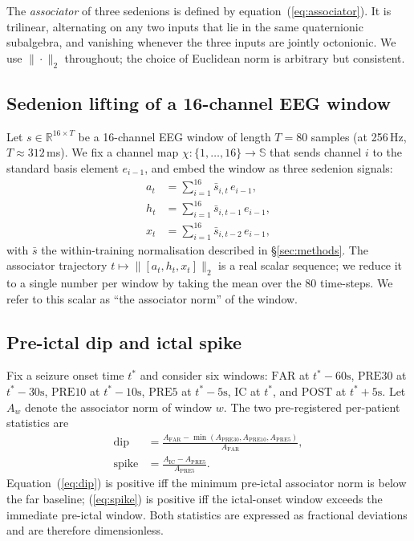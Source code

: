 \documentclass[11pt,twocolumn]{article}
\begin{document}
The \emph{associator} of three sedenions is defined by
equation~(\ref{eq:associator}). It is trilinear, alternating on any
two inputs that lie in the same quaternionic subalgebra, and
vanishing whenever the three inputs are jointly octonionic. We use
$\|\cdot\|_2$ throughout; the choice of Euclidean norm is arbitrary
but consistent.

\subsection{Sedenion lifting of a 16-channel EEG window}
Let $s\in\mathbb{R}^{16\times T}$ be a 16-channel EEG window of
length $T=80$ samples (at 256\,Hz, $T\approx 312$\,ms). We fix a
channel map $\chi:\{1,\ldots,16\}\to\mathbb{S}$ that sends channel
$i$ to the standard basis element $e_{i-1}$, and embed the window as
three sedenion signals:
\begin{align}
  a_t &= \textstyle\sum_{i=1}^{16} \bar{s}_{i,t}\,e_{i-1}, \\
  h_t &= \textstyle\sum_{i=1}^{16} \bar{s}_{i,t-1}\,e_{i-1}, \\
  x_t &= \textstyle\sum_{i=1}^{16} \bar{s}_{i,t-2}\,e_{i-1},
\end{align}
with $\bar{s}$ the within-training normalisation described in
\S\ref{sec:methods}. The associator trajectory
$t\mapsto \|[a_t,h_t,x_t]\|_2$ is a real scalar sequence; we reduce
it to a single number per window by taking the mean over the 80
time-steps. We refer to this scalar as ``the associator norm'' of the
window.

\subsection{Pre-ictal dip and ictal spike}
Fix a seizure onset time $t^{\ast}$ and consider six windows:
$\mathrm{FAR}$ at $t^{\ast}-60\text{s}$,
$\mathrm{PRE30}$ at $t^{\ast}-30\text{s}$,
$\mathrm{PRE10}$ at $t^{\ast}-10\text{s}$,
$\mathrm{PRE5}$ at $t^{\ast}-5\text{s}$,
$\mathrm{IC}$ at $t^{\ast}$, and
$\mathrm{POST}$ at $t^{\ast}+5\text{s}$.
Let $A_w$ denote the associator norm of window $w$.
The two pre-registered per-patient statistics are
\begin{align}
  \mathrm{dip} &=
    \frac{A_{\mathrm{FAR}}
    - \min(A_{\mathrm{PRE30}},A_{\mathrm{PRE10}},A_{\mathrm{PRE5}})}
    {A_{\mathrm{FAR}}},
    \label{eq:dip}\\
  \mathrm{spike} &=
    \frac{A_{\mathrm{IC}} - A_{\mathrm{PRE5}}}{A_{\mathrm{PRE5}}}.
    \label{eq:spike}
\end{align}
Equation~(\ref{eq:dip}) is positive iff the minimum pre-ictal
associator norm is below the far baseline; (\ref{eq:spike}) is
positive iff the ictal-onset window exceeds the immediate
pre-ictal window. Both statistics are expressed as fractional
deviations and are therefore dimensionless.
\end{document}
